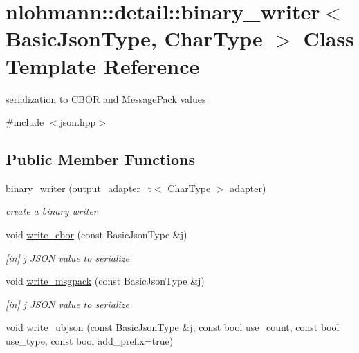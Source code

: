 \hypertarget{classnlohmann_1_1detail_1_1binary__writer}{}\section{nlohmann\+:\+:detail\+:\+:binary\+\_\+writer$<$ Basic\+Json\+Type, Char\+Type $>$ Class Template Reference}
\label{classnlohmann_1_1detail_1_1binary__writer}


serialization to C\+B\+OR and Message\+Pack values  




{\ttfamily \#include $<$json.\+hpp$>$}

\subsection*{Public Member Functions}
\begin{DoxyCompactItemize}
\item 
\mbox{\hyperlink{classnlohmann_1_1detail_1_1binary__writer_a373289af95a946c19bb4a58a5df71a78}{binary\+\_\+writer}} (\mbox{\hyperlink{namespacenlohmann_1_1detail_a9b680ddfb58f27eb53a67229447fc556}{output\+\_\+adapter\+\_\+t}}$<$ Char\+Type $>$ adapter)
\begin{DoxyCompactList}\small\item\em create a binary writer \end{DoxyCompactList}\item 
\mbox{\label{classnlohmann_1_1detail_1_1binary__writer_aa0ab8d27fd88a33a2f801413ac4c7fbc}} 
void \mbox{\hyperlink{classnlohmann_1_1detail_1_1binary__writer_aa0ab8d27fd88a33a2f801413ac4c7fbc}{write\+\_\+cbor}} (const Basic\+Json\+Type \&j)
\begin{DoxyCompactList}\small\item\em \mbox{[}in\mbox{]} j J\+S\+ON value to serialize \end{DoxyCompactList}\item 
\mbox{\label{classnlohmann_1_1detail_1_1binary__writer_ae4e0852b64102ce4b07d99f08f828b7c}} 
void \mbox{\hyperlink{classnlohmann_1_1detail_1_1binary__writer_ae4e0852b64102ce4b07d99f08f828b7c}{write\+\_\+msgpack}} (const Basic\+Json\+Type \&j)
\begin{DoxyCompactList}\small\item\em \mbox{[}in\mbox{]} j J\+S\+ON value to serialize \end{DoxyCompactList}\item 
void \mbox{\hyperlink{classnlohmann_1_1detail_1_1binary__writer_a0f6c65053d859269f88eb4ebb0cd7060}{write\+\_\+ubjson}} (const Basic\+Json\+Type \&j, const bool use\+\_\+count, const bool use\+\_\+type, const bool add\+\_\+prefix=true)
\end{DoxyCompactItemize}


